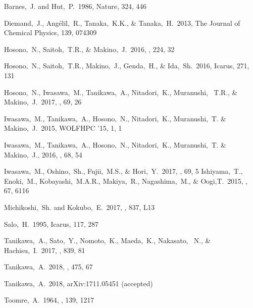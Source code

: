 \documentclass[proof,useamsfonts]{pasj01}
\begin{document}
\begin{thebibliography}{}

{Barnes},~J. and {Hut},~P.\ 1986, Nature, 324, 446

Diemand,~J., Ang{\' e}lil,~R., Tanaka,~K.K., \& Tanaka,~H.\ 2013, The Journal of Chemical Physics, 139, 074309

Hosono,~N., Saitoh,~T.R., \& Makino,~J.\ 2016, \apjsupp, 224, 32

Hosono,~N., Saitoh,~T.R., Makino,~J., Genda,~H., \& Ida,~Sh.\ 2016, Icarus, 271, 131

Hosono,~N., Iwasawa,~M., Tanikawa,~A., Nitadori,~K., Muranushi, ~T.R., \& Makino,~J.\ 2017, \pasj, 69, 26

Iwasawa,~M., Tanikawa,~A., Hosono,~N., Nitadori,~K., Muranushi,~T. \& Makino,~J.\ 2015, WOLFHPC '15, 1, 1

Iwasawa,~M.,  Tanikawa,~A., Hosono,~N., Nitadori,~K., Muranushi,~T. \& Makino,~J., 2016, \pasj, 68, 54

Iwasawa,~M., Oshino,~Sh., Fujii,~M.S., \& Hori,~Y.\ 2017, \pasj, 69, 5
Ishiyama,~T., Enoki,~M., Kobayashi,~M.A.R., Makiya,~R., Nagashima,~M., \& Oogi,T.\ 2015, \pasj, 67, 6116

{Michikoshi},~Sh. and {Kokubo},~E.\ 2017, \apjlett, 837, L13 

Salo,~H.\ 1995, {Icarus}, 117, 287

Tanikawa,~A., Sato,~Y., Nomoto,~K., Maeda,~K., Nakasato,~ N., \&  Hachisu,~I.\ 2017, \apj, 839, 81

Tanikawa,~A.\ 2018, \mnras, 475, 67

Tanikawa,~A.\ 2018, arXiv:1711.05451 (accepted)

Toomre,~A.\ 1964, \apj, 139, 1217

\end{thebibliography}


\end{document}

